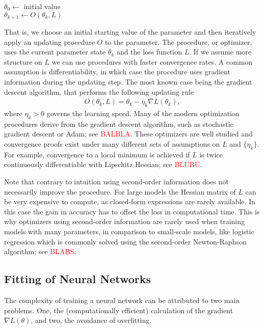 \begin{algorithmic}[1]
\State $\theta_0 \gets$ initial value
\\
$\theta_{k+1} \gets O(\theta_k, L)$
\EndWhile
\end{algorithmic}
That is, we choose an initial starting value of the parameter and then iteratively apply
an updating procedure $O$ to the parameter. The procedure, or optimizer, uses the
current parameter state $\theta_k$ and the loss function $L$. If we assume more
structure on $L$ we can use procedures with faster convergence rates. A common
assumption is differentiability, in which case the procedure uses gradient information
during the updating step. The most known case being the gradient descent algorithm, that
performs the following updating rule
\begin{align}
    O(\theta_k, L) = \theta_k - \eta_k \nabla L(\theta_k),
    \tag{GD}
\end{align}
where $\eta_k > 0$ governs the learning speed. Many of the modern optimization
procedures derive from the gradient descent algorithm, such as stochastic gradient
descent or Adam; see \textcolor{red}{BALBLA}. These optimizers are well studied and
convergence proofs exist under many different sets of assumptions on $L$ and
$\{\eta_k\}$. For example, convergence to a local minimum is achieved if $L$ is twice
continuously differentiable with Lipschitz Hessian; see \textcolor{red}{BLUBU}.

Note that contrary to intuition using second-order information does not necessarily
improve the procedure. For large models the Hessian matrix of $L$ can be very expensive
to compute, as closed-form expressions are rarely available. In this case the gain in
accuracy has to offset the loss in computational time. This is why optimizers using
second-order information are rarely used when training models with many parameters, in
comparison to small-scale models, like logistic regression which is commonly solved
using the second-order Newton-Raphson algorithm; see \textcolor{red}{BLABS}.


\subsection{Fitting of Neural Networks}

The complexity of training a neural network can be attributed to two main problems. One,
the (computationally efficient) calculation of the gradient $\nabla L(\theta)$, and two,
the avoidance of overfitting.

